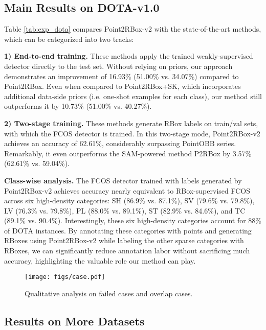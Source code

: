 \subsection{Main Results on DOTA-v1.0}
\label{sec:experiment-main}

Table \ref{tab:exp_dota} compares Point2RBox-v2 with the state-of-the-art methods, which can be categorized into two tracks: 

\textbf{1) End-to-end training.} These methods apply the trained weakly-supervised detector directly to the test set. Without relying on priors, our approach demonstrates an improvement of 16.93\% (51.00\% vs. 34.07\%) compared to Point2RBox. Even when compared to Point2RBox+SK, which incorporates additional data-side priors (i.e. one-shot examples for each class), our method still outperforms it by 10.73\% (51.00\% vs. 40.27\%).

\textbf{2) Two-stage training.} These methods generate RBox labels on train/val sets, with which the FCOS detector is trained. In this two-stage mode, Point2RBox-v2 achieves an accuracy of 62.61\%, considerably surpassing PointOBB series. Remarkably, it even outperforms the SAM-powered method P2RBox by 3.57\% (62.61\% vs. 59.04\%).

\textbf{Class-wise analysis.} The FCOS detector trained with labels generated by Point2RBox-v2 achieves accuracy nearly equivalent to RBox-supervised FCOS across six high-density categories: SH (86.9\% vs. 87.1\%), SV (79.6\% vs. 79.8\%), LV (76.3\% vs. 79.8\%), PL (88.0\% vs. 89.1\%), ST (82.9\% vs. 84.6\%), and TC (89.1\% vs. 90.4\%). Interestingly, these six high-density categories account for 88\% of DOTA instances. By annotating these categories with points and generating RBoxes using Point2RBox-v2 while labeling the other sparse categories with RBoxes, we can significantly reduce annotation labor without sacrificing much accuracy, highlighting the valuable role our method can play.

\begin{figure*}[t!]
\setlength{\abovecaptionskip}{1.2mm}
\centering
\texttt{[image: figs/case.pdf]}
\caption{Qualitative analysis on failed cases and overlap cases.}
\label{fig:case}
\vspace{-6pt}
\end{figure*}

\subsection{Results on More Datasets}

